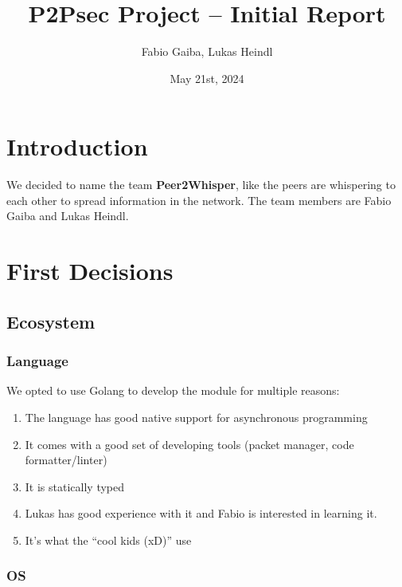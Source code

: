 \documentclass[a4paper,english,10pt,NET]{tumarticle}
\title{P2Psec Project -- Initial Report}
\author{Fabio Gaiba, Lukas Heindl}
\date{May 21st, 2024}
\begin{document}
\maketitle
{}
\thispagestyle{tumarticle}

\section{Introduction}

We decided to name the team \textbf{Peer2Whisper}, like the peers are whispering to each other to spread information in the network. The team members are Fabio Gaiba and Lukas Heindl.




\section{First Decisions}
\subsection{Ecosystem}
\subsubsection{Language}

We opted to use Golang to develop the module for multiple reasons:

\begin{enumerate}
	\item The language has good native support for asynchronous programming 
	\item It comes with a good set of developing tools (packet manager, code formatter/linter)
	\item It is statically typed  
	\item Lukas has good experience with it and Fabio is interested in learning it.
	\item It's what the \enquote{cool kids (xD)} use
\end{enumerate}


\subsubsection{OS}
\end{document}
